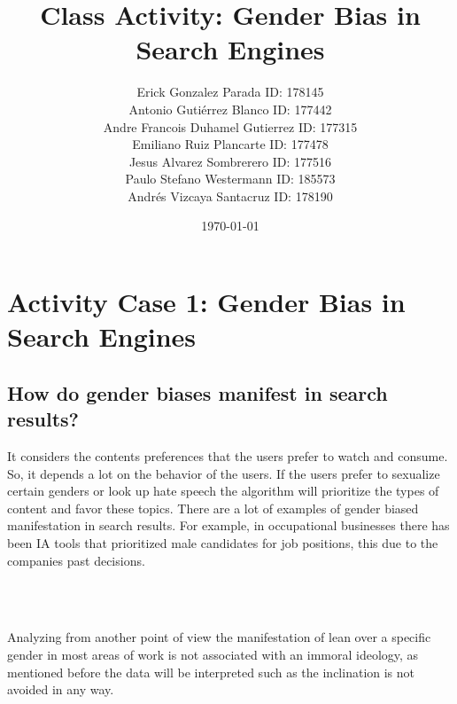 \documentclass[twoside]{article}
\begin{document}

\renewcommand{\footrulewidth}{1pt}

\title{Class Activity: Gender Bias in Search Engines}
\author{Erick Gonzalez Parada ID: 178145 \\ \vspace{2mm}
Antonio Gutiérrez Blanco ID: 177442 \\ \vspace{2mm}
Andre Francois Duhamel Gutierrez ID: 177315 \\ \vspace{2mm}
Emiliano Ruiz Plancarte ID: 177478 \\ \vspace{2mm}
Jesus Alvarez Sombrerero ID: 177516 \\ \vspace{2mm}
Paulo Stefano Westermann ID: 185573 \\ \vspace{2mm}
Andrés Vizcaya Santacruz ID: 178190
}
\date{\today}


\maketitle

\newpage

\section*{Activity Case 1: Gender Bias in Search Engines}

\subsection*{How do gender biases manifest in search results?}
\begin{justifying}
It considers the contents preferences that the users prefer to watch and consume. So, it depends a lot on the behavior of the users. If the users prefer to sexualize certain genders or look up hate speech the algorithm will prioritize the types of content and favor these topics. There are a lot of examples of gender biased manifestation in search results. For example, in occupational businesses there has been IA tools that prioritized male candidates for job positions, this due to the companies past decisions.
\end{justifying}
\\
\\
\begin{justifying}
Analyzing from another point of view the manifestation of lean over a specific gender in most areas of work is not associated with an immoral ideology, as mentioned before the data will be interpreted such as the inclination is not avoided in any way.
\end{justifying}
\end{document}
